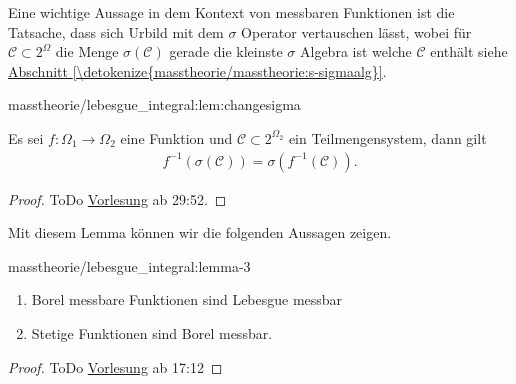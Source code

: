 \par
Eine wichtige Aussage in dem Kontext von messbaren Funktionen ist die Tatsache, dass sich Urbild mit dem \(\sigma\) Operator vertauschen lässt, wobei für \(\mathcal{C}\subset 2^\Omega\) die Menge \(\sigma(\mathcal{C})\) gerade die kleinste \(\sigma\) Algebra ist welche \(\mathcal{C}\) enthält siehe \hyperref[\detokenize{masstheorie/masstheorie:s-sigmaalg}]{Abschnitt \ref{\detokenize{masstheorie/masstheorie:s-sigmaalg}}}.
\begin{lemma}{}{masstheorie/lebesgue_integral:lem:changesigma}



\par
Es sei \(f:\Omega_1\to\Omega_2\) eine Funktion und \(\mathcal{C}\subset 2^{\Omega_2}\) ein Teilmengensystem, dann gilt
\begin{align*}
f^{-1}(\sigma(\mathcal{C})) = \sigma(f^{-1}(\mathcal{C})).
\end{align*}\end{lemma}

\begin{proof}
 ToDo
\href{https://www.fau.tv/clip/id/40563}{Vorlesung} ab 29:52.
\end{proof}

\par
Mit diesem Lemma können wir die folgenden Aussagen zeigen.
\begin{lemma}{}{masstheorie/lebesgue_integral:lemma-3}


\begin{enumerate}

\item {} 
\par
Borel messbare Funktionen sind Lebesgue messbar

\item {} 
\par
Stetige Funktionen sind Borel messbar.

\end{enumerate}
\end{lemma}

\begin{proof}
 ToDo
\href{https://www.fau.tv/clip/id/40563}{Vorlesung} ab 17:12
\end{proof}


